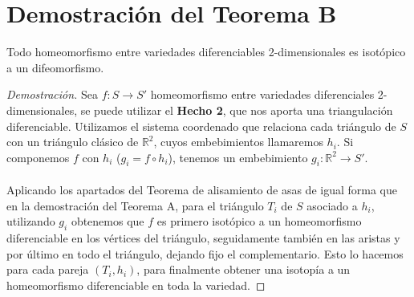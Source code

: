 \section{Demostración del Teorema B}
	\begin{teorb}
		Todo homeomorfismo entre variedades diferenciables 2-dimensionales es isotópico a un difeomorfismo.
	\end{teorb}
	\begin{proof}[Demostración]
		Sea $f: S \rightarrow S'$ homeomorfismo entre variedades diferenciales 2-dimensionales, se puede utilizar el \textbf{Hecho 2}, que nos aporta una triangulación diferenciable. Utilizamos el sistema coordenado que relaciona cada triángulo de $S$ con un triángulo clásico de $\mathbb{R}^2$, cuyos embebimientos llamaremos $h_i$. Si componemos $f$ con $h_i$ ($g_i=f\circ h_i$), tenemos un embebimiento $g_i: \mathbb{R}^2 \rightarrow S'$.\\
		\\ Aplicando los apartados del Teorema de alisamiento de asas de igual forma que en la demostración del Teorema A, para el triángulo $T_i$ de $S$ asociado a $h_i$, utilizando $g_i$ obtenemos que $f$ es primero isotópico a un homeomorfismo diferenciable en los vértices del triángulo, seguidamente también en las aristas y por último en todo el triángulo, dejando fijo el complementario. Esto lo hacemos para cada pareja $(T_i, h_i)$, para finalmente obtener una isotopía a un homeomorfismo diferenciable en toda la variedad.
	\end{proof}
\endinput
